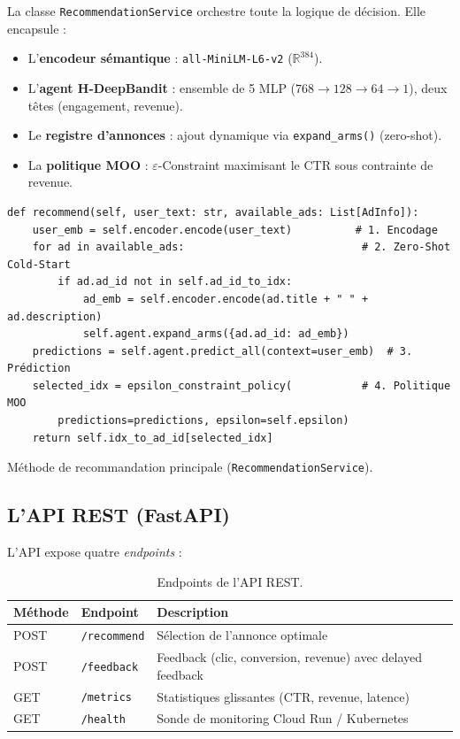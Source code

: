 La classe \texttt{RecommendationService} orchestre toute la logique de décision. Elle encapsule :

\begin{itemize}
    \item L'\textbf{encodeur sémantique} : \texttt{all-MiniLM-L6-v2} \parencite{reimers2019sentence} ($\mathbb{R}^{384}$).
    \item L'\textbf{agent H-DeepBandit} : ensemble de 5 MLP ($768 \to 128 \to 64 \to 1$), deux têtes (engagement, revenue).
    \item Le \textbf{registre d'annonces} : ajout dynamique via \texttt{expand\_arms()} (zero-shot).
    \item La \textbf{politique MOO} : $\varepsilon$-Constraint maximisant le CTR sous contrainte de revenue.
\end{itemize}

\begin{listing}[htbp]
\begin{verbatim}
def recommend(self, user_text: str, available_ads: List[AdInfo]):
    user_emb = self.encoder.encode(user_text)          # 1. Encodage
    for ad in available_ads:                            # 2. Zero-Shot Cold-Start
        if ad.ad_id not in self.ad_id_to_idx:
            ad_emb = self.encoder.encode(ad.title + " " + ad.description)
            self.agent.expand_arms({ad.ad_id: ad_emb})
    predictions = self.agent.predict_all(context=user_emb)  # 3. Prédiction
    selected_idx = epsilon_constraint_policy(           # 4. Politique MOO
        predictions=predictions, epsilon=self.epsilon)
    return self.idx_to_ad_id[selected_idx]
\end{verbatim}
\caption{Méthode de recommandation principale (\texttt{RecommendationService}).}
\label{lst:recommend_ch4}
\end{listing}

\subsection{L'API REST (FastAPI)}

L'API expose quatre \textit{endpoints} :

\begin{table}[H]
    \centering
    \begin{tabular}{l l L{7cm}}
        \toprule
        \textbf{Méthode} & \textbf{Endpoint} & \textbf{Description} \\
        \midrule
        POST & \texttt{/recommend} & Sélection de l'annonce optimale \\
        POST & \texttt{/feedback}  & Feedback (clic, conversion, revenue) avec delayed feedback \\
        GET  & \texttt{/metrics}   & Statistiques glissantes (CTR, revenue, latence) \\
        GET  & \texttt{/health}    & Sonde de monitoring Cloud Run / Kubernetes \\
        \bottomrule
    \end{tabular}
    \caption{Endpoints de l'API REST.}
    \label{tab:api_endpoints_ch4}
\end{table}

